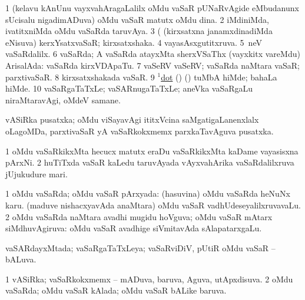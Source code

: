 \noindent
\gl{\pagu}
\bmng
\bnum
\num{1}  (kelavu kAnUnu vayxvahAragaLalilx oMdu vaSaR  pUNaRvAgide eMbudanunx sUcisalu nigadimADuva) oMdu vaSaR matutx oMdu dina. 
\num{2}  iMdiniMda, ivatitxniMda oMdu vaSaRda taruvAya. 
\num{3}  (  (kirxsatxna janamxdinadiMda eNisuva) kerxYsatxvaSaR; kirxsatxshaka.  
\num{4}  vayasAsxgutitxruva.  
\num{5}  \kirxsha \eng{$\ldots$}\,neV vaSaRdalilx.  
\num{6}  vaSaRda; A vaSaRda atayxMta sherxVSaThx (vayxkitx \mo vareMdu) ArisalAda:  vaSaRda kirxVDApaTu. 
\num{7}  vaSeRV vaSeRV; vaSaRda naMtara vaSaR; parxtivaSaR.  
\num{8}  kirxsatxshakada vaSaR.  
\num{9}  \hyperref{kandict_d.pdf}{D}{dot(1) nuga(3)}{$^1$dot} (\birx) (\AmA) tuMbA hiMde; bahaLa hiMde.
\num{10}  vaSaRgaTaTxLe; vaSARnugaTaTxLe; aneVka vaSaRgaLu niraMtaravAgi, oMdeV samane.
\enum
\emng 
\eentry

\bentry
{} 
\gl{\nA} 
\bmng
vASiRka pusatxka; oMdu viSayavAgi ititxVcina saMgatigaLanenxlalx oLagoMDa, parxtivaSaR yA vaSaRkokxmemx  parxkaTavAguva pusatxka.
\emng
\eentry

\bentry
{} 
\gl{\nA} 
\bmng
\bnum
\num{1} oMdu vaSaRkikxMta hecucx matutx eraDu vaSaRkikxMta kaDame vayasisxna pArxNi. 
\num{2} huTiTxda vaSaR kaLedu taruvAyada vAyxvahArika vaSaRdalilxruva jUjukudure mari.
\enum
\emng
\eentry

\bentry
{} 
\gl{\gu} 
\bmng
\bnum
\num{1} oMdu vaSaRda; oMdu vaSaR pArxyada:  (hasuvina) oMdu vaSaRda heNuNx karu.  (maduve nishacxyavAda anaMtara) oMdu vaSaR vadhUdeseyalilxruvavaLu. 
\num{2} oMdu vaSaRda naMtara avadhi mugidu hoVguva; oMdu vaSaR mAtarx siMdhuvAgiruva:  oMdu vaSaR avadhige siVmitavAda sAlapatarxgaLu.
\enum
\emng
\eentry


\bentry
{} 
\gl{\gu} 
\bmng
vaSARdayxMtada; vaSaRgaTaTxLeya; vaSaRviDiV, pUtiR oMdu vaSaR -- bALuva.
\emng
\eentry

\bentry
{} 
\gl{\gu} 
\bmng
\bnum
\num{1} vASiRka; vaSaRkokxmemx -- mADuva, baruva, Aguva, utApxdisuva. 
\num{2} oMdu vaSaRda; oMdu vaSaR kAlada; oMdu vaSaR bALike baruva.
\enum
\emng
\eentry

